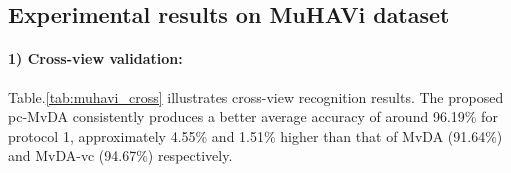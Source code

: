 
\subsection{Experimental results on MuHAVi dataset}
    \paragraph{1) Cross-view validation:} Table.\ref{tab:muhavi_cross} illustrates cross-view recognition results. The proposed pc-MvDA consistently produces a better average accuracy of around 96.19\% for protocol 1, approximately 4.55\% and 1.51\% higher than that of MvDA (91.64\%) and MvDA-vc (94.67\%) respectively.

    \begin{table}[htbp]
    \centering
    \caption{Cross-view recognition comparison on MuHAVi dataset}
    \label{tab:muhavi_cross}
    \end{table}


